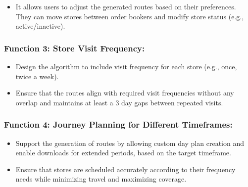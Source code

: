     \begin{itemize}
        \item It allows users to adjust the generated routes based on their preferences. They can move stores between order bookers and modify store status (e.g., active/inactive).
    \end{itemize}

 


\subsubsection*{Function 3: Store Visit Frequency: 
}

\begin{itemize}
    \item Design the algorithm to include visit frequency for each store (e.g., once, twice a week).
    \item Ensure that the routes align with required visit frequencies without any overlap and maintains at least a 3 day gaps between repeated visits.
\end{itemize}

\subsubsection*{Function 4: Journey Planning for Different Timeframes: 
}

\begin{itemize}
    \item Support the generation of routes 
by allowing custom day plan creation and enable downloads for extended periods, based on the target timeframe.
    \item Ensure that stores are scheduled accurately according to their frequency needs while minimizing travel and maximizing coverage.
\end{itemize}



 


